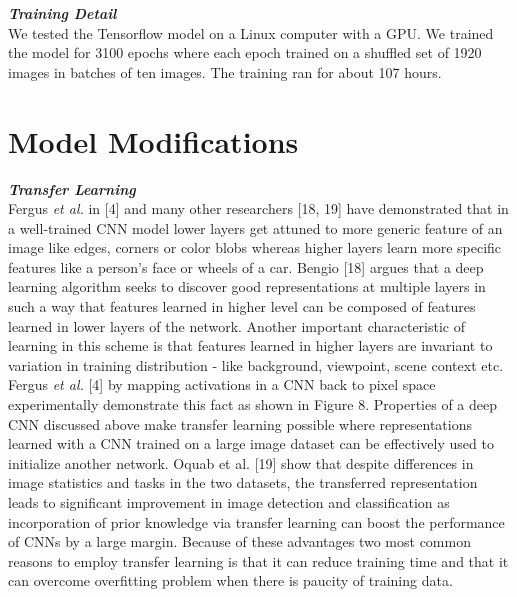 \documentclass [11pt,letterpaper ,twoside ,openany ]{report}
\begin{document}
    \noindent
    \textbf{\textit{Training Detail}}\\
    We tested the Tensorflow\textsuperscript{\textregistered} model on a Linux computer with a GPU. We trained the model for 3100  epochs where each epoch trained on a shuffled set of 1920 images in batches of ten images. The training ran for about 107 hours.

    \section{Model Modifications}

    \noindent
    \textbf{\textit{Transfer Learning}}\\
    Fergus \textit {et al.} in [4] and many other researchers [18, 19] have demonstrated that in a well-trained CNN model lower layers get attuned to more generic feature of an image like edges, corners or color blobs whereas higher layers learn more specific features like a person's face or wheels of a car. Bengio [18] argues that a deep learning algorithm seeks to discover good representations at multiple layers  in such a way that features learned in higher level can be composed of features learned in lower layers of the network. Another important characteristic of learning in this scheme is that features learned in higher layers are invariant to variation in training distribution - like background, viewpoint, scene context etc. Fergus \textit {et al.} [4] by mapping activations in a CNN back to pixel space experimentally demonstrate this fact as shown in Figure 8. Properties of a deep CNN discussed above make transfer learning possible where representations learned with a CNN trained on a large image dataset can be effectively used to  initialize another network. Oquab et al. [19] show that despite differences in image statistics and tasks in the two datasets, the transferred representation leads to significant improvement in image detection and classification as incorporation of prior knowledge via transfer learning can boost the performance of CNNs by a large margin. Because of these advantages two most common reasons to employ transfer learning is that it can reduce training time and that it can overcome overfitting problem when there is paucity of training data.\\
\end{document}
